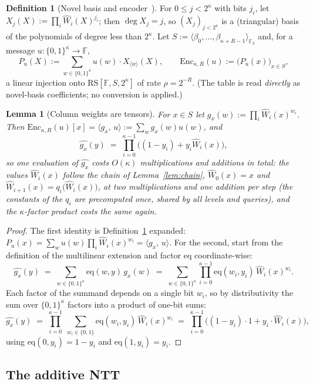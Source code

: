 \documentclass[11pt]{article}
\newcommand{\F}{\mathbb{F}}
\newcommand{\Ftwo}{\mathbb{F}_2}
\newcommand{\eq}{\mathrm{eq}}
\newcommand{\Enc}{\mathrm{Enc}}
\newcommand{\RS}{\mathrm{RS}}
\newcommand{\cube}[1]{\{0,1\}^{#1}}
\newcommand{\inner}[2]{\langle #1,\, #2 \rangle}
\newcommand{\pol}[1]{\widehat{#1}}
\newcommand{\Wn}[1]{\widehat{W}_{#1}}   %
\theoremstyle{plain}
\newtheorem{lemma}[theorem]{Lemma}
\theoremstyle{definition}
\newtheorem{definition}[theorem]{Definition}
\theoremstyle{remark}
\begin{document}
\begin{definition}[Novel basis and encoder~\cite{LCH14}]\label{def:enc}
For $0 \le j < 2^{\kappa}$ with bits $j_i$, let $X_j(X) := \prod_i \Wn{i}(X)^{j_i}$; then $\deg X_j = j$, so $(X_j)_{j < 2^\kappa}$ is a (triangular) basis of the polynomials of degree less than $2^{\kappa}$. Let $S := \langle \beta_0, \dots, \beta_{\kappa+R-1} \rangle_{\Ftwo}$ and, for a message $u : \cube{\kappa} \to \F$,
\[
P_u(X) := \sum_{w \in \cube{\kappa}} u(w) \cdot X_{\langle w \rangle}(X), \qquad \Enc_{\kappa,R}(u) := \bigl(P_u(x)\bigr)_{x \in S},
\]
a linear injection onto $\RS[\F, S, 2^{\kappa}]$ of rate $\rho = 2^{-R}$. (The table is read \emph{directly} as novel-basis coefficients; no conversion is applied.)
\end{definition}

\begin{lemma}[Column weights are tensors]\label{lem:colweight}
For $x \in S$ let $g_x(w) := \prod_i \Wn{i}(x)^{w_i}$. Then $\Enc_{\kappa,R}(u)[x] = \inner{g_x}{u} := \sum_w g_x(w) u(w)$, and
\[
\pol{g_x}(y) \;=\; \prod_{i=0}^{\kappa-1} \bigl( (1-y_i) + y_i \Wn{i}(x) \bigr),
\]
so one evaluation of $\pol{g_x}$ costs $O(\kappa)$ multiplications and additions in total: the values $\Wn{i}(x)$ follow the chain of Lemma~\ref{lem:chain}, $\Wn{0}(x) = x$ and $\Wn{i+1}(x) = q_i\bigl(\Wn{i}(x)\bigr)$, at two multiplications and one addition per step (the constants of the $q_i$ are precomputed once, shared by all levels and queries), and the $\kappa$-factor product costs the same again.
\end{lemma}

\begin{proof}
The first identity is Definition~\ref{def:enc} expanded: $P_u(x) = \sum_w u(w) \prod_i \Wn{i}(x)^{w_i} = \inner{g_x}{u}$. For the second, start from the definition of the multilinear extension and factor $\eq$ coordinate-wise:
\[
\pol{g_x}(y) \;=\; \sum_{w \in \cube{\kappa}} \eq(w, y)\, g_x(w) \;=\; \sum_{w \in \cube{\kappa}} \prod_{i=0}^{\kappa-1} \eq(w_i, y_i)\, \Wn{i}(x)^{w_i} .
\]
Each factor of the summand depends on a single bit $w_i$, so by distributivity the sum over $\cube{\kappa}$ factors into a product of one-bit sums:
\[
\pol{g_x}(y) \;=\; \prod_{i=0}^{\kappa-1} \; \sum_{w_i \in \{0,1\}} \eq(w_i, y_i)\, \Wn{i}(x)^{w_i} \;=\; \prod_{i=0}^{\kappa-1} \bigl( (1-y_i) \cdot 1 + y_i \cdot \Wn{i}(x) \bigr),
\]
using $\eq(0, y_i) = 1 - y_i$ and $\eq(1, y_i) = y_i$.
\end{proof}

\subsection{The additive NTT}\label{sec:ntt}
\end{document}
